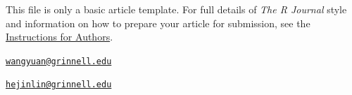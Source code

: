 This file is only a basic article template. For full details of
\emph{The R Journal} style and information on how to prepare your
article for submission, see the
\href{https://journal.r-project.org/share/author-guide.pdf}{Instructions
for Authors}. 

\address{%
Yuan Wang\\
Grinnell College\\
1115 8th Ave\\ Grinnell, IA 50112\\
}
\href{mailto:wangyuan@grinnell.edu}{\nolinkurl{wangyuan@grinnell.edu}}

\address{%
Author Two\\
Affiliation\\
11155 8th Ave\\ Grinnell, IA 50112\\
}
\href{mailto:hejinlin@grinnell.edu}{\nolinkurl{hejinlin@grinnell.edu}}

